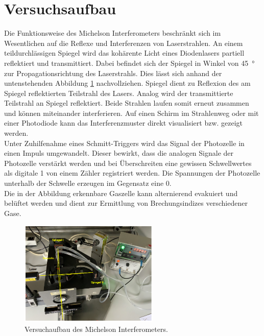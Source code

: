 


\section{Versuchsaufbau}

Die Funktionsweise des Michelson Interferometers beschränkt sich  im Wesentlichen auf die Reflexe und Interferenzen 
von Laserstrahlen. An einem teildurchlässigen Spiegel wird das kohärente Licht eines Diodenlasers partiell reflektiert 
und transmittiert. Dabei befindet sich der Spiegel in Winkel von \qty{45}{\degree} zur Propagationsrichtung des Laserstrahls.
Dies lässt sich anhand der untenstehenden Abbildung \ref{fig:Aufbau} nachvollziehen. Spiegel  dient zu Reflexion des 
am Spiegel reflektierten Teilstrahl des Lasers. Analog wird der transmittierte Teilstrahl an Spiegel  reflektiert.
Beide Strahlen laufen somit erneut zusammen und können miteinander interferieren. Auf einen Schirm im Strahlenweg oder mit einer
Photodiode kann das Interferenzmuster direkt visualisiert bzw. gezeigt werden.\\

\noindent Unter Zuhilfenahme eines Schmitt-Triggers wird das Signal der Photozelle in einen Impuls umgewandelt. Dieser bewirkt,
dass die analogen Signale der Photozelle verstärkt werden und bei Überschreiten eine gewissen Schwellwertes als digitale 1 von 
einem Zähler registriert werden. Die Spannungen der Photozelle unterhalb der Schwelle erzeugen im Gegensatz eine 0.\\

\noindent Die in der Abbildung erkennbare Gaszelle kann alternierend evakuiert und belüftet werden und dient zur Ermittlung 
von Brechungsindizes verschiedener Gase.

\begin{figure}[H]
    \centering
    \includegraphics[height=5cm]{Aufbau.png}
    \caption{Versuchaufbau des Michelson Interferometers\cite{Versuchsanleitung_v401}.}
    \label{fig:Aufbau}
\end{figure}

